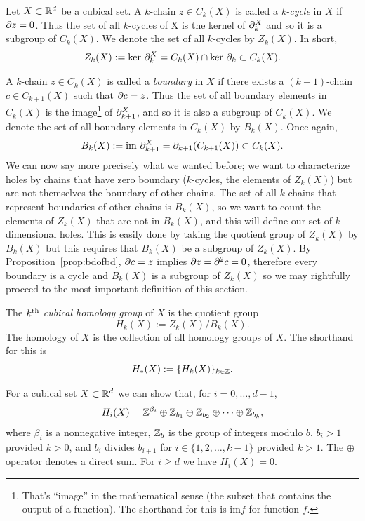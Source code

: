 \begin{defn}
	Let $X \subset \mathbb{R}^d$ be a cubical set. A $k$-chain $z \in C_k(X)$ is called a \textit{k-cycle} in $X$ if $\partial z = 0$. Thus the set of all $k$-cycles of X is the kernel of $\partial_k^X$ and so it is a subgroup of $C_k(X)$. We denote the set of all $k$-cycles by $Z_k(X)$. In short,
	\begin{align}
		Z_k(X) := \text{ker } \partial_k^X = C_k(X) \cap \text{ker } \partial_k \subset C_k(X).
	\end{align}
\end{defn}

%
A $k$-chain $z \in C_k(X)$ is called a \textit{boundary} in $X$ if there exists a $(k+1)$-chain $c \in C_{k+1}(X)$ such that $\partial c = z$. Thus the set of all boundary elements in $C_k(X)$ is the image\footnote{That's ``image'' in the mathematical sense (\ie the subset that contains the output of a function). The shorthand for this is $\text{im} f$ for function $f$.} of $\partial_{k+1}^X$, and so it is also a subgroup of $C_k(X)$. We denote the set of all boundary elements in $C_k(X)$ by $B_k(X)$. Once again,
%
\begin{align}
	B_k(X) := \text{im } \partial_{k+1}^X = \partial_{k+1} (C_{k+1}(X)) \subset C_k(X).
\end{align}
%
We can now say more precisely what we wanted before; we want to characterize holes by chains that have zero boundary (\ie $k$-cycles, the elements of $Z_k(X)$) but are not themselves the boundary of other chains. The set of all $k$-chains that represent boundaries of other chains is $B_k(X)$, so we want to count the elements of $Z_k(X)$ that are not in $B_k(X)$, and this will define our set of $k$-dimensional holes. This  is easily done by taking the quotient group of $Z_k(X)$ by $B_k(X)$ but this requires that $B_k(X)$ be a subgroup of $Z_k(X)$. By Proposition~\ref{prop:bdofbd}, $\partial c = z$ implies $\partial z = \partial^2 c = 0$, therefore every boundary is a cycle and $B_k(X)$ is a subgroup of $Z_k(X)$ so we may rightfully proceed to the most important definition of this section.

\begin{defn}
	The $k\textsuperscript{th}$ \textit{cubical homology group} of $X$ is the quotient group
	$$ H_k(X) := Z_k(X) / B_k(X). $$
	The homology of $X$ is the collection of all homology groups of $X$. The shorthand for this is
	$$ H_{*}(X) := \{ H_k(X) \}_{k \in \mathbb{Z}} .$$
\end{defn}%

For a cubical set $X \subset \mathbb{R}^d$ we can show that, for $i = 0, \ldots, d-1$, 
$$H_i(X) = \mathbb{Z}^{\beta_i} \oplus \mathbb{Z}_{b_1} \oplus \mathbb{Z}_{b_2} \oplus \cdots \oplus \mathbb{Z}_{b_k},$$ 
where $\beta_i$ is a nonnegative integer, $\mathbb{Z}_b$ is the group of integers modulo $b$, $b_i > 1$ provided $k > 0$, and $b_i$ divides $b_{i+1}$ for $i \in \{ 1, 2, \ldots, k-1 \}$ provided $k > 1$. The $\oplus$ operator denotes a direct sum. For $ i \geq d$ we have $H_i(X) = 0$.

